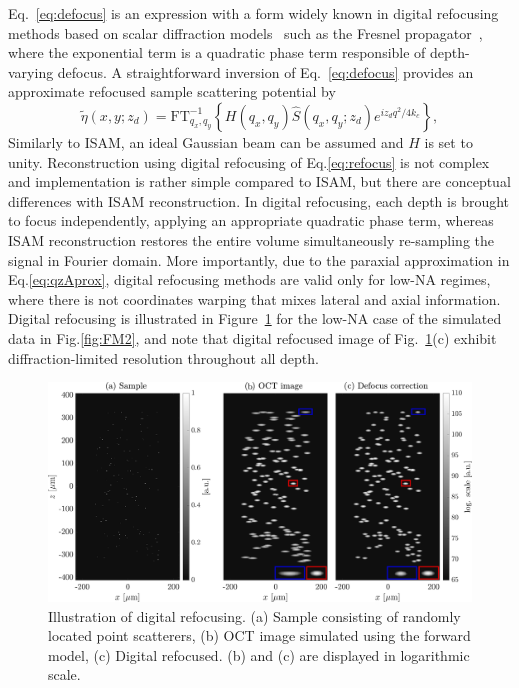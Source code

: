 Eq.~\eqref{eq:defocus} is an expression with a form widely known in digital refocusing methods based on scalar diffraction models~\cite{Ralston2005_Deconvolution, Yu2007_Improved, Liu2009_Deconvolution} such as the Fresnel propagator~\cite{Yasuno2006_Noniterative}, where the exponential term is a quadratic phase term responsible of depth-varying defocus. A straightforward inversion of Eq.~\eqref{eq:defocus} provides an approximate refocused sample scattering potential by~\cite{South2016_Computed}
\begin{equation}\label{eq:refocus}
    \tilde{\eta}(x,y; z_d) = \text{FT}^{-1}_{q_x, q_y}\left\{H(q_x, q_y)\hat{S}(q_x, q_y; z_d) e^{iz_dq^2/4k_c}\right\},
\end{equation}
Similarly to ISAM, an ideal Gaussian beam can be assumed and $H$ is set to unity. Reconstruction using digital refocusing of Eq.\eqref{eq:refocus} is not complex and implementation is rather simple compared to ISAM, but there are conceptual differences with ISAM reconstruction. In digital refocusing, each depth is brought to focus independently, applying an appropriate quadratic phase term, whereas ISAM reconstruction restores the entire volume simultaneously re-sampling the signal in Fourier domain. More importantly, due to the paraxial approximation in Eq.\eqref{eq:qzAprox}, digital refocusing methods are valid only for low-NA regimes, where there is not coordinates warping that mixes lateral and axial information. Digital refocusing is illustrated in Figure~\ref{fig:IM2} for the low-NA case of the simulated data in Fig.\ref{fig:FM2}, and note that digital refocused image of Fig.~\ref{fig:IM2}(c) exhibit diffraction-limited resolution throughout all depth.

\begin{figure}[htb!]
    \centering
    \includegraphics[width=\textwidth]{Figures/TheoreticalBasis/IM_Refocus.pdf}
    \caption[Illustration of digital refocusing.]{Illustration of digital refocusing. (a) Sample consisting of randomly located point scatterers, (b) OCT image simulated using the forward model, (c) Digital refocused. (b) and (c) are displayed in logarithmic scale.}
    \label{fig:IM2}
\end{figure}

